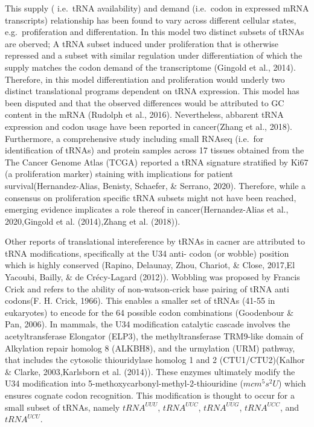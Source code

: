 \documentclass[12pt,openany]{book}
\begin{document}
This supply ( i.e.~tRNA availability) and demand (i.e.~codon in
expressed mRNA transcripts) relationship has been found to vary across
different cellular states, e.g.~profiferation and differentation. In
this model two distinct subsets of tRNAs are oberved; A tRNA subset
induced under proliferation that is otherwise repressed and a subset
with similar regulation under differentiation of which the supply
matches the codon demand of the transcriptome (Gingold et al., 2014).
Therefore, in this model differentiation and proliferation would underly
two distinct translational programs dependent on tRNA expression. This
model has been disputed and that the observed differences would be
attributed to GC content in the mRNA (Rudolph et al., 2016).
Nevertheless, abbarent tRNA expression and codon usage have been
reported in cancer(Zhang et al., 2018). Furthermore, a comprehensive
study including small RNAseq (i.e.~for identification of tRNAs) and
protein samples across 17 tissues obtained from the The Cancer Genome
Atlas (TCGA) reported a tRNA signature stratified by Ki67 (a
proliferation marker) staining with implications for patient
survival(Hernandez-Alias, Benisty, Schaefer, \& Serrano, 2020).
Therefore, while a consensus on proliferation specific tRNA subsets
might not have been reached, emerging evidence implicates a role thereof
in cancer(Hernandez-Alias et al., 2020,Gingold et al. (2014),Zhang et
al. (2018)).

Other reports of translational intereference by tRNAs in cacner are
attributed to tRNA modifications, specifically at the U34 anti- codon
(or wobble) position which is highly conserved (Rapino, Delaunay, Zhou,
Chariot, \& Close, 2017,El Yacoubi, Bailly, \& de Crécy-Lagard (2012)).
Wobbling was proposed by Francis Crick and refers to the ability of
non-watson-crick base pairing of tRNA anti codons(F. H. Crick, 1966).
This enables a smaller set of tRNAs (41-55 in eukaryotes) to encode for
the 64 possible codon combinations (Goodenbour \& Pan, 2006). In
mammals, the U34 modification catalytic cascade involves the
acetyltransferase Elongator (ELP3), the methyltransferase TRM9-like
domain of Alkylation repair homolog 8 (ALKBH8), and the urmylation (URM)
pathway, that includes the cytosolic thiouridylase homolog 1 and 2
(CTU1/CTU2)(Kalhor \& Clarke, 2003,Karlsborn et al. (2014)). These
enzymes ultimately modify the U34 modification into
5-methoxycarbonyl-methyl-2-thiouridine (\(mcm^5s^2U\)) which ensures
cognate codon recognition. This modification is thought to occur for a
small subset of tRNAs, namely \(tRNA^{UUU}\), \(tRNA^{UUC}\),
\(tRNA^{UUG}\), \(tRNA^{UCC}\), and \(tRNA^{UCU}\).
\end{document}
